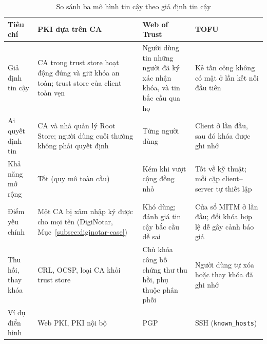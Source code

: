 \begin{table}[!htbp]
\centering
\small
\renewcommand{\arraystretch}{1.12}
\begin{tabularx}{\textwidth}{>{\raggedright\arraybackslash}p{2.6cm}>{\raggedright\arraybackslash}X>{\raggedright\arraybackslash}X>{\raggedright\arraybackslash}X}
\toprule
\textbf{Tiêu chí} & \textbf{PKI dựa trên CA} & \textbf{Web of Trust} & \textbf{TOFU} \\
\midrule
Giả định tin cậy & CA trong trust store hoạt động đúng và giữ khóa an toàn; trust store của client toàn vẹn & Người dùng tin những người đã ký xác nhận khóa, và tin bắc cầu qua họ & Kẻ tấn công không có mặt ở lần kết nối đầu tiên \\
\midrule
Ai quyết định tin & CA và nhà quản lý Root Store; người dùng cuối thường không phải quyết định & Từng người dùng & Client ở lần đầu, sau đó khóa được ghi nhớ \\
\midrule
Khả năng mở rộng & Tốt (quy mô toàn cầu) & Kém khi vượt cộng đồng nhỏ & Tốt về kỹ thuật; mỗi cặp client--server tự thiết lập \\
\midrule
Điểm yếu chính & Một CA bị xâm nhập ký được cho mọi tên (DigiNotar, Mục~\ref{subsec:diginotar-case}) & Khó dùng; đánh giá tin cậy bắc cầu dễ sai & Cửa sổ MITM ở lần đầu; đổi khóa hợp lệ dễ gây cảnh báo giả \\
\midrule
Thu hồi, thay khóa & CRL, OCSP, loại CA khỏi trust store & Chủ khóa công bố chứng thư thu hồi, phụ thuộc phân phối & Người dùng tự xóa hoặc thay khóa đã ghi nhớ \\
\midrule
Ví dụ điển hình & Web PKI, PKI nội bộ & PGP & SSH (\texttt{known\_hosts}) \\
\bottomrule
\end{tabularx}
\caption{So sánh ba mô hình tin cậy theo giả định tin cậy}
\label{tab:trust-models}
\end{table}
